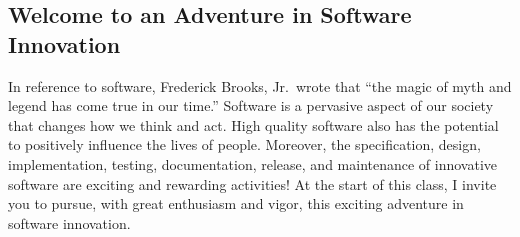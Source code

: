 \documentclass[11pt]{article}
\begin{document}
\subsection*{Welcome to an Adventure in Software Innovation}

In reference to software, Frederick Brooks, Jr.\ wrote that ``the magic of myth
and legend has come true in our time.'' Software is a pervasive aspect of our
society that changes how we think and act. High quality software also has the
potential to positively influence the lives of people. Moreover, the
specification, design, implementation, testing, documentation, release, and
maintenance of innovative software are exciting and rewarding activities! At the
start of this class, I invite you to pursue, with great enthusiasm and vigor,
this exciting adventure in software innovation.
\end{document}
